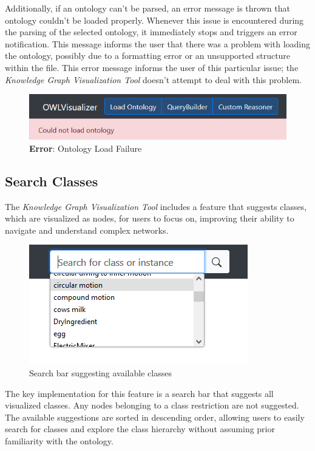 Additionally, if an ontology can't be parsed, an error message is thrown that ontology couldn't be
loaded properly. Whenever this issue is encountered during the parsing of the selected ontology, it immediately stops and triggers an error notification. 
This message informs the user that there was a problem with loading the ontology, possibly due to a formatting error or an unsupported structure within the file. 
This error message informs the user of this particular issue; the \textit{Knowledge Graph Visualization Tool} doesn't attempt to deal with this problem.

\begin{figure}[H]
    \includegraphics[scale=0.5]{Graphics/OwlVisualizer/loadOntology3.png}
    \centering
    \caption{\textbf{Error}: Ontology Load Failure}
    \label{fig:loadOntology3}
\end{figure}

\subsection{Search Classes}
The \textit{Knowledge Graph Visualization Tool} includes a feature that suggests classes, which are visualized as nodes, 
for users to focus on, improving their ability to navigate and understand complex networks.

\begin{figure}[H]
    \includegraphics[scale=0.6]{Graphics/OwlVisualizer/searchClass1.png}
    \centering
    \caption{Search bar suggesting available classes}
\end{figure}

The key implementation for this feature is a search bar that suggests all visualized classes. 
Any nodes belonging to a class restriction are not suggested. 
The available suggestions are sorted in descending order, allowing users to easily search
for classes and explore the class hierarchy without assuming prior familiarity with the ontology.

